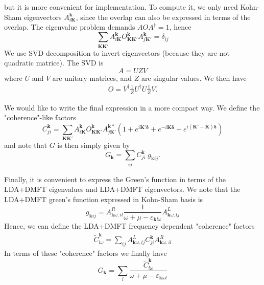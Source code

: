 \documentclass[aps,prb,floatfix,epsfig,twocolumn,showpacs,preprintnumbers]{revtex4}
\newcommand{\vk}{{\mathbf{k}}}
\newcommand{\vdelta}{{\mathbf{\delta}}}
\newcommand{\vK}{{\mathbf{K}}}
\begin{document}
but it is more convenient for implementation.
To compute it, we only
need Kohn-Sham eigenvectors $A^\vk_{i\vK}$, since the overlap can also
be expressed in terms of the overlap. The eigenvalue problem demands
$A O A^\dagger  = 1$, hence
\begin{equation}
\sum_{\vK\vK'} A^\vk_{i\vK} O^\vk_{\vK \vK'} A^\vk_{j\vK'} = \delta_{ij}
\end{equation}
We use SVD decomposition to invert eigenvectors (because they are not
quadratic matrice). The SVD is
\begin{equation}
A = U Z V  
\end{equation}
where $U$ and $V$ are unitary matrices, and $Z$ are singular
values. We then have
\begin{eqnarray}
O = V^\dagger \frac{1}{Z} U^\dagger U \frac{1}{Z} V.
\end{eqnarray}

We would like to write the final expression in a more compact way. We
define the "coherence"-like factors
\begin{equation}
 C^\vk_{ji} = 
 \sum_{\vK \vK'} A^\vk_{i\vK} O^\vk_{\vK\vK'}A^{\vk *}_{j\vK'}(1+e^{i\vK'\vdelta}+e^{-i\vK\vdelta}+e^{i(\vK'-\vK)\vdelta}) 
\end{equation}
and note that $G$ is then simply given by
\begin{equation}
 G_\vk =  \sum_{ij} C^\vk_{ji}\; g_{\vk ij}.
\end{equation}

Finally, it is convenient to express the Green's function in terms of
the LDA+DMFT eigenvalues and LDA+DMFT eigenvectors. We note that the
LDA+DMFT green's function expressed in Kohn-Sham basis is
\begin{equation}
g_{\vk ij} = A^{R}_{\vk\omega,i l} \frac{1}{\omega+\mu-\varepsilon_{\vk
    l\omega}} A^{L}_{\vk\omega,l j}
\end{equation}
Hence, we can define the LDA+DMFT frequency dependent "coherence" factors
\begin{eqnarray}
\widetilde{C}^\vk_{l\omega} = \sum_{ij} A^{L}_{\vk\omega,l j} C^\vk_{ji} A^{R}_{\vk\omega,i l} 
\end{eqnarray}
In terms of these "coherence" factors we finally have
\begin{equation}
G_\vk = \sum_l 
\frac{\widetilde{C}^\vk_{l\omega}}{\omega+\mu-\varepsilon_{\vk\omega l}}
\end{equation}
\end{document}
